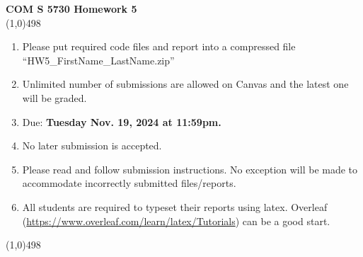 \documentclass[11pt]{article}
\begin{document}
\begin{center}
{\Large \textbf{COM S 5730 Homework 5}}\\

\linethickness{1mm}\line(1,0){498}

\begin{enumerate}
\item Please put required code files and report into a
compressed file ``HW5\_FirstName\_LastName.zip''
\item Unlimited number of submissions are
allowed on Canvas and the latest one will be graded.
\item Due: \textbf{Tuesday Nov. 19, 2024 at 11:59pm.}
\item {\color{red}No later submission is accepted.}
\item Please read and follow submission instructions. No exception will be made to accommodate incorrectly submitted files/reports.
\item All students are required to typeset their reports using latex. Overleaf
(\url{https://www.overleaf.com/learn/latex/Tutorials}) can be a good start.
\end{enumerate}

\linethickness{1mm}\line(1,0){498}

\end{center}


\end{document}
